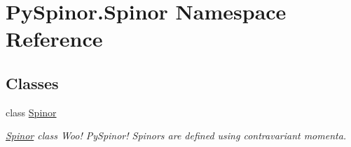 \hypertarget{namespace_py_spinor_1_1_spinor}{}\section{Py\+Spinor.\+Spinor Namespace Reference}
\label{namespace_py_spinor_1_1_spinor}
\subsection*{Classes}
\begin{DoxyCompactItemize}
\item 
class \hyperlink{class_py_spinor_1_1_spinor_1_1_spinor}{Spinor}
\begin{DoxyCompactList}\small\item\em \hyperlink{class_py_spinor_1_1_spinor_1_1_spinor}{Spinor} class Woo! Py\+Spinor! Spinors are defined using contravariant momenta. \end{DoxyCompactList}\end{DoxyCompactItemize}

